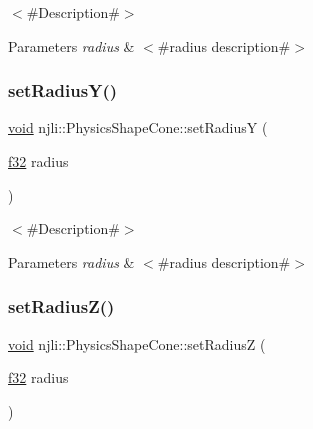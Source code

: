 $<$\#\+Description\#$>$


\begin{DoxyParams}{Parameters}
{\em radius} & $<$\#radius description\#$>$ \\
\hline
\end{DoxyParams}
\mbox{\label{classnjli_1_1_physics_shape_cone_add9d625b2039fa0689e410cf86f2df88}} 
\subsubsection{\texorpdfstring{set\+Radius\+Y()}{setRadiusY()}}
{\footnotesize\ttfamily \mbox{\hyperlink{_thread_8h_af1e856da2e658414cb2456cb6f7ebc66}{void}} njli\+::\+Physics\+Shape\+Cone\+::set\+RadiusY (\begin{DoxyParamCaption}\item[{\mbox{\hyperlink{_util_8h_a5f6906312a689f27d70e9d086649d3fd}{f32}}}]{radius }\end{DoxyParamCaption})}

$<$\#\+Description\#$>$


\begin{DoxyParams}{Parameters}
{\em radius} & $<$\#radius description\#$>$ \\
\hline
\end{DoxyParams}
\mbox{\label{classnjli_1_1_physics_shape_cone_a67f210be934ad9f9ce06d5edbfa0ee53}} 
\subsubsection{\texorpdfstring{set\+Radius\+Z()}{setRadiusZ()}}
{\footnotesize\ttfamily \mbox{\hyperlink{_thread_8h_af1e856da2e658414cb2456cb6f7ebc66}{void}} njli\+::\+Physics\+Shape\+Cone\+::set\+RadiusZ (\begin{DoxyParamCaption}\item[{\mbox{\hyperlink{_util_8h_a5f6906312a689f27d70e9d086649d3fd}{f32}}}]{radius }\end{DoxyParamCaption})}

